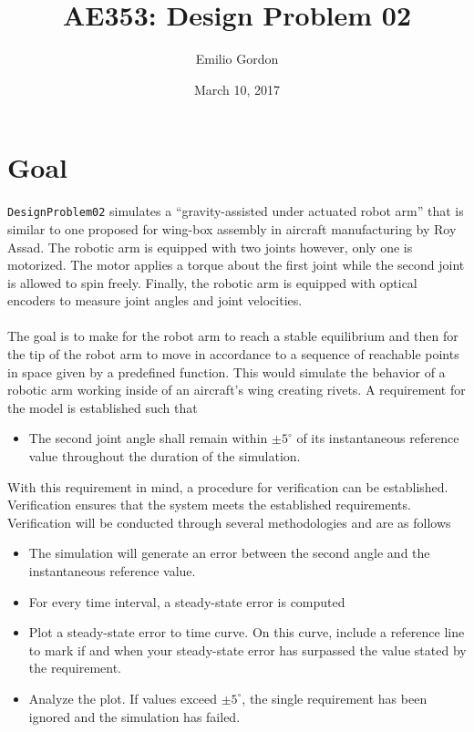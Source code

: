 \documentclass[12pt]{article}
\title{AE353: Design Problem 02}
\author{Emilio Gordon}
\date{March 10, 2017}
\begin{document}
\maketitle


\section{Goal}
\lstinline!DesignProblem02! simulates a ``gravity-assisted under actuated robot arm'' that is similar to one proposed for wing-box assembly in aircraft manufacturing by Roy Assad. The robotic arm is equipped with two joints however, only one is motorized. The motor applies a torque about the first joint while the second joint is allowed to spin freely. Finally, the robotic arm is equipped with optical encoders to measure joint angles and joint velocities.
\\ \\
The goal is to make for the robot arm to reach a stable equilibrium and then for the tip of the robot arm to move in accordance to a sequence of reachable points in space given by a predefined function. This would simulate the behavior of a robotic arm working inside of an aircraft's wing creating rivets. A requirement for the model is established such that
\begin{itemize}
	\item The second joint angle shall remain within  $\pm5^{\circ}$ of its instantaneous reference value throughout the duration of the simulation.
\end{itemize}
With this requirement in mind, a procedure for verification can be established. Verification ensures that the system meets the established requirements. Verification will be conducted through several methodologies and are as follows
\begin{itemize}
	\item The simulation will generate an error between the second angle and the instantaneous reference value.
	\item For every time interval, a steady-state error is computed
	\item Plot a steady-state error to time curve. On this curve, include a reference line to mark if and when your steady-state error has surpassed the value stated by the requirement.
	\item Analyze the plot. If values exceed  $\pm5^{\circ}$, the single requirement has been ignored and the simulation has failed.
\end{itemize}
\end{document}
